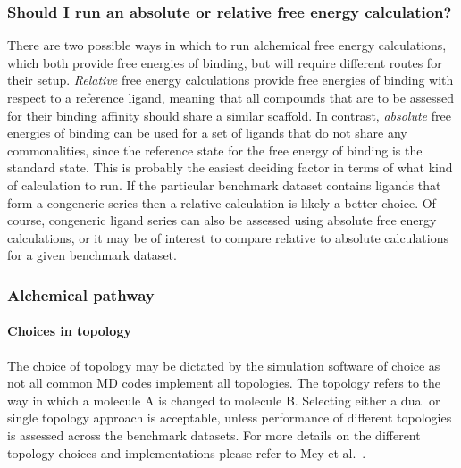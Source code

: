 \documentclass[9pt,bestpractices]{livecoms}
\begin{document}
\subsubsection{Should I run an absolute or relative free energy calculation?}
There are two possible ways in which to run alchemical free energy calculations, which both provide free energies of binding, but will require different routes for their setup. \textit{Relative} free energy calculations provide free energies of binding with respect to a reference ligand, meaning that all compounds that are to be assessed for their binding affinity should share a similar scaffold. In contrast, \textit{absolute} free energies of binding can be used for a set of ligands that do not share any commonalities, since the reference state for the free energy of binding is the standard state. This is probably the easiest deciding factor in terms of what kind of calculation to run. If the particular benchmark dataset contains ligands that form a congeneric series then a relative calculation is likely a better choice. Of course, congeneric ligand series can also be assessed using absolute free energy calculations, or it may be of interest to compare relative to absolute calculations for a given benchmark dataset. 


\subsubsection{Alchemical pathway}

\paragraph{Choices in topology}
The choice of topology may be dictated by the simulation software of choice as not all common MD codes implement all topologies. The topology refers to the way in which a molecule A is changed to molecule B. Selecting either a dual or single topology approach is acceptable, unless performance of different topologies is assessed across the benchmark datasets. For more details on the different topology choices and implementations please refer to Mey et al.~\cite{meyBestPracticesAlchemical2020}.
\end{document}
